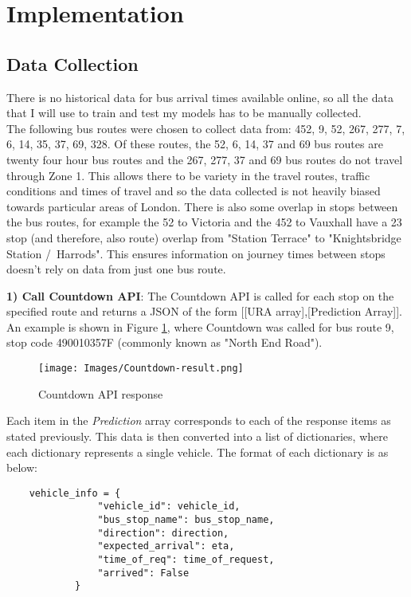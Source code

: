 \documentclass[12pt, a4paper]{article}
\begin{document}
\section{Implementation}

\subsection{Data Collection}

There is no historical data for bus arrival times available online, so all the data that I will use to train and test my models has to be manually collected. \\

The following bus routes were chosen to collect data from: 452, 9, 52, 267, 277, 7, 6, 14, 35, 37, 69, 328. Of these routes, the 52, 6, 14, 37 and 69 bus routes are twenty four hour bus routes and the 267, 277, 37 and 69 bus routes do not travel through Zone 1. This allows there to be variety in the travel routes, traffic conditions and times of travel and so the data collected is not heavily biased towards particular areas of London. There is also some overlap in stops between the bus routes, for example the 52 to Victoria and the 452 to Vauxhall have a 23 stop (and therefore, also route) overlap from "Station Terrace" to  "Knightsbridge Station /\ Harrods". This ensures information on journey times between stops doesn't rely on data from just one bus route.

\textbf{1) Call Countdown API}: The Countdown API is called for each stop on the specified route and returns a JSON of the form [[URA array],[Prediction Array]]. An example is shown in Figure \ref{fig:countdown-response}, where Countdown was called for bus route 9, stop code 490010357F (commonly known as "North End Road"). 

\begin{figure}[H]
\begin{center}
    \texttt{[image: Images/Countdown-result.png]}
    \caption{Countdown API response}
    \label{fig:countdown-response}
\end{center}
\end{figure}

Each item in the \textit{Prediction} array corresponds to each of the response items as stated previously. This data is then converted into a list of dictionaries, where each dictionary represents a single vehicle. The format of each dictionary is as below:

\begin{lstlisting}
    vehicle_info = {
                "vehicle_id": vehicle_id,
                "bus_stop_name": bus_stop_name,
                "direction": direction,
                "expected_arrival": eta,
                "time_of_req": time_of_request,
                "arrived": False
            }
\end{lstlisting}
\end{document}
